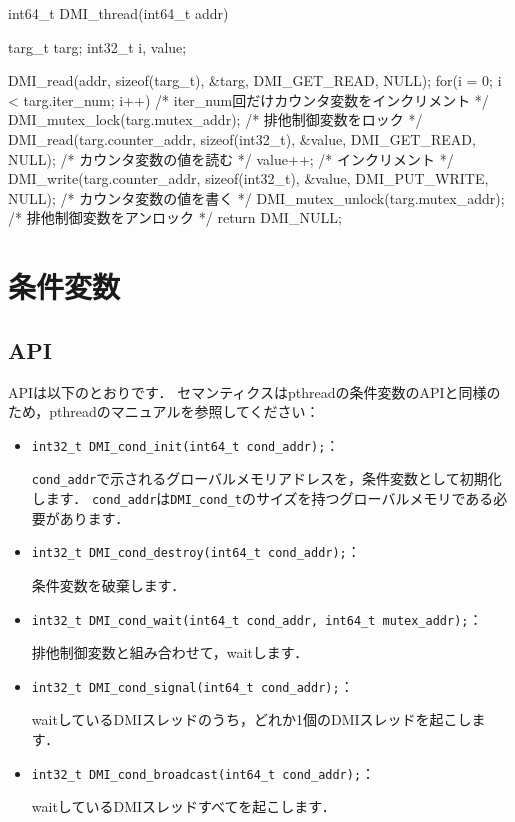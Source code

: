 \documentclass[report,12pt]{jsbook}
\begin{document}
\begin{code}
int64_t DMI_thread(int64_t addr)
{
  targ_t targ;
  int32_t i, value;
  
  DMI_read(addr, sizeof(targ_t), &targ, DMI_GET_READ, NULL);
  for(i = 0; i < targ.iter_num; i++)  /* iter_num回だけカウンタ変数をインクリメント */
    {
      DMI_mutex_lock(targ.mutex_addr);  /* 排他制御変数をロック */
      DMI_read(targ.counter_addr, sizeof(int32_t), &value, DMI_GET_READ, NULL);  /* カウンタ変数の値を読む */
      value++;  /* インクリメント */
      DMI_write(targ.counter_addr, sizeof(int32_t), &value, DMI_PUT_WRITE, NULL);  /* カウンタ変数の値を書く */
      DMI_mutex_unlock(targ.mutex_addr);  /* 排他制御変数をアンロック */
    }
  return DMI_NULL;
}
\end{code}

\section{条件変数}

\subsection{API}

APIは以下のとおりです．
セマンティクスはpthreadの条件変数のAPIと同様のため，pthreadのマニュアルを参照してください：
\begin{itemize}
\item \texttt{int32\_t DMI\_cond\_init(int64\_t cond\_addr);}：
  
  \texttt{cond\_addr}で示されるグローバルメモリアドレスを，条件変数として初期化します．
  \texttt{cond\_addr}は\texttt{DMI\_cond\_t}のサイズを持つグローバルメモリである必要があります．
\item \texttt{int32\_t DMI\_cond\_destroy(int64\_t cond\_addr);}：
  
  条件変数を破棄します．
\item \texttt{int32\_t DMI\_cond\_wait(int64\_t cond\_addr, int64\_t mutex\_addr);}：
  
  排他制御変数と組み合わせて，waitします．
\item \texttt{int32\_t DMI\_cond\_signal(int64\_t cond\_addr);}：
  
  waitしているDMIスレッドのうち，どれか1個のDMIスレッドを起こします．
\item \texttt{int32\_t DMI\_cond\_broadcast(int64\_t cond\_addr);}：
  
  waitしているDMIスレッドすべてを起こします．
\end{itemize}
\end{document}
